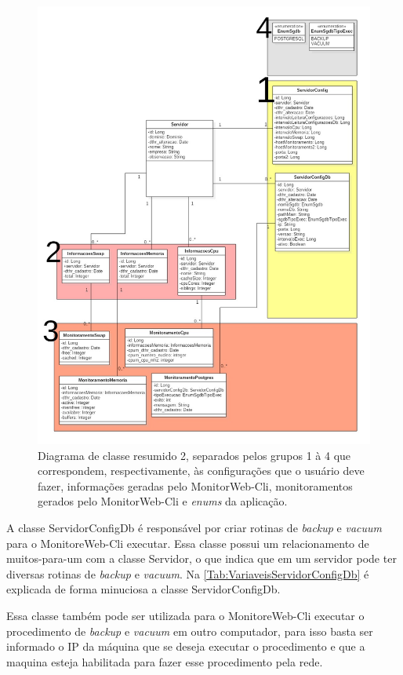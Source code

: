 \begin{figure}[H]
	\centering
	\includegraphics[width=1.0\textwidth]{figuras/DiagramaDeClass2.jpg}
	\caption[Diagrama de classe resumido 2.]{Diagrama de classe resumido 2, separados pelos grupos 1 à 4 que correspondem, respectivamente, às configurações que o usuário deve fazer, informações geradas pelo MonitorWeb-Cli, monitoramentos gerados pelo MonitorWeb-Cli e \textit{enums} da aplicação.}
	\label{Img:DiagramaDeClass2}
\end{figure}

A classe ServidorConfigDb é responsável por criar rotinas de \textit{backup} e \textit{vacuum} para o MonitoreWeb-Cli executar. Essa classe possui um relacionamento de muitos-para-um com a classe Servidor, o que indica que em um servidor pode ter diversas rotinas de \textit{backup} e \textit{vacuum}. Na \autoref{Tab:VariaveisServidorConfigDb} é explicada de forma minuciosa a classe ServidorConfigDb.

Essa classe também pode ser utilizada para o MonitoreWeb-Cli executar o procedimento de \textit{backup} e \textit{vacuum} em outro computador, para isso basta ser informado o IP da máquina que se deseja executar o procedimento e que a maquina esteja habilitada para fazer esse procedimento pela rede.

